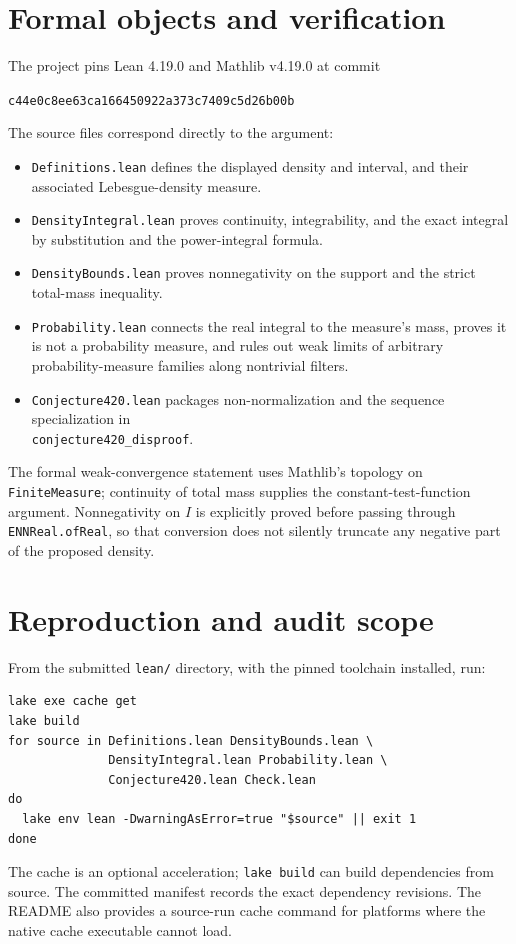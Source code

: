 \documentclass[11pt]{article}
\begin{document}
\section{Formal objects and verification}
The project pins Lean 4.19.0 and Mathlib v4.19.0 at commit
\begin{center}\small\texttt{c44e0c8ee63ca166450922a373c7409c5d26b00b}\end{center}
The source files correspond directly to the argument:
\begin{itemize}
\item \texttt{Definitions.lean} defines the displayed density and interval, and their associated Lebesgue-density measure.
\item \texttt{DensityIntegral.lean} proves continuity, integrability, and the exact integral by substitution and the power-integral formula.
\item \texttt{DensityBounds.lean} proves nonnegativity on the support and the strict total-mass inequality.
\item \texttt{Probability.lean} connects the real integral to the measure's mass, proves it is not a probability measure, and rules out weak limits of arbitrary probability-measure families along nontrivial filters.
\item \texttt{Conjecture420.lean} packages non-normalization and the sequence specialization in\\
\texttt{conjecture420\_disproof}.
\end{itemize}
The formal weak-convergence statement uses Mathlib's topology on \texttt{FiniteMeasure}; continuity of total mass supplies the constant-test-function argument. Nonnegativity on $I$ is explicitly proved before passing through \texttt{ENNReal.ofReal}, so that conversion does not silently truncate any negative part of the proposed density.
\newpage

\section{Reproduction and audit scope}
From the submitted \texttt{lean/} directory, with the pinned toolchain installed, run:
\begin{verbatim}
lake exe cache get
lake build
for source in Definitions.lean DensityBounds.lean \
              DensityIntegral.lean Probability.lean \
              Conjecture420.lean Check.lean
do
  lake env lean -DwarningAsError=true "$source" || exit 1
done
\end{verbatim}
The cache is an optional acceleration; \texttt{lake build} can build dependencies from source. The committed manifest records the exact dependency revisions. The README also provides a source-run cache command for platforms where the native cache executable cannot load.
\end{document}
